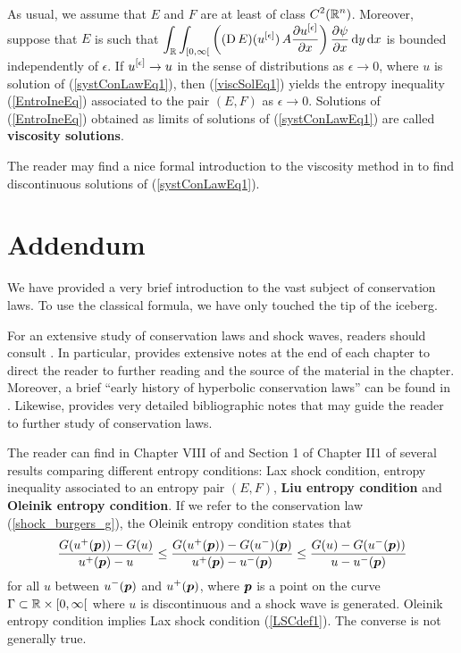 As usual, we assume that $E$ and $F$ are at least of class
$\displaystyle C^2(\mathbb{R}^n)$.  Moreover, suppose that $E$ is such that
$\displaystyle \int_{\mathbb{R}} \int_{[0,\infty[}
\left( (\operatorname{D} E)(u^{[\epsilon]}) \,
A \frac{\partial{u^{[\epsilon]}}}{\partial x} \right) \frac{\partial{\psi}}{\partial x} \,\mathrm{d}{y}\,\mathrm{d}{x}$ is
bounded independently of $\epsilon$.
If $\displaystyle u^{[\epsilon]} \to u$ in the sense of distributions as
$\epsilon \to 0$, where $u$ is solution of (\ref{systConLawEq1}),
then (\ref{viscSolEq1}) yields
the entropy inequality (\ref{EntroIneEq}) associated to the pair
$(E,F)$ as $\epsilon \to 0$.  Solutions of (\ref{EntroIneEq})
obtained as limits of solutions of (\ref{systConLawEq1}) are called
{\bfseries viscosity solutions}.

The reader may find a nice formal introduction to the viscosity method in
\cite{Sal} to find discontinuous solutions of (\ref{systConLawEq1}).

\section{Addendum}

We have provided a very brief introduction to the vast subject of
conservation laws.  To use the classical formula, we have only
touched the tip of the iceberg.

For an extensive study of conservation laws and shock waves, readers
should consult \cite{Daf,LeF,Smo}.  In particular, \cite{Daf}
provides extensive notes at the end of each chapter to direct the
reader to further reading and the source of the material in the
chapter.  Moreover, a brief ``early history of hyperbolic
conservation laws'' can be found in \cite{Daf}.  Likewise, \cite{LeF}
provides very detailed bibliographic notes that may guide the reader
to further study of conservation laws.

The reader can find in Chapter VIII of \cite{Daf} and Section 1 of
Chapter II1 of \cite{LeF} several results comparing different entropy
conditions: Lax shock condition, entropy inequality associated to an
entropy pair $(E,F)$, 
{\bfseries Liu entropy condition} and 
{\bfseries Oleinik entropy condition}.  If we refer to the conservation law
(\ref{shock_burgers_g}), the Oleinik entropy condition states that
\[
\frac{G(u^+({\bm{p}})) - G(u)}{u^+({\bm{p}}) - u} \leq 
\frac{G(u^+({\bm{p}})) - G(u^-)({\bm{p}})}{u^+({\bm{p}}) - u^-({\bm{p}})}
\leq \frac{G(u) - G(u^-({\bm{p}}))}{u - u^-({\bm{p}})}
\]
for all $u$ between $\displaystyle u^-({\bm{p}})$ and
$\displaystyle u^+({\bm{p}})$, where
${\bm{p}}$ is a point on the curve $\Gamma \subset \mathbb{R}\times [0,\infty[$
where $u$ is discontinuous and a shock wave is generated.  Oleinik entropy
condition implies Lax shock condition (\ref{LSCdef1}).  The converse
is not generally true.

